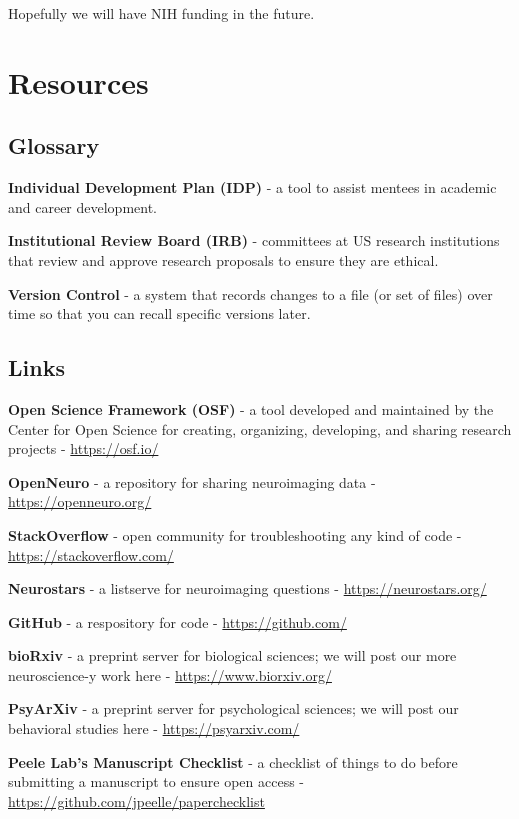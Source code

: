 \documentclass[
]{book}
\begin{document}
Hopefully we will have NIH funding in the future.

\hypertarget{resources}{%
\chapter{Resources}\label{resources}}

\hypertarget{glossary}{%
\section{Glossary}\label{glossary}}

\textbf{Individual Development Plan (IDP)} - a tool to assist mentees in academic and career development.

\textbf{Institutional Review Board (IRB)} - committees at US research institutions that review and approve research proposals to ensure they are ethical.

\textbf{Version Control} - a system that records changes to a file (or set of files) over time so that you can recall specific versions later.

\hypertarget{links}{%
\section{Links}\label{links}}

\textbf{Open Science Framework (OSF)} - a tool developed and maintained by the Center for Open Science for creating, organizing, developing, and sharing research projects - \url{https://osf.io/}

\textbf{OpenNeuro} - a repository for sharing neuroimaging data - \url{https://openneuro.org/}

\textbf{StackOverflow} - open community for troubleshooting any kind of code - \url{https://stackoverflow.com/}

\textbf{Neurostars} - a listserve for neuroimaging questions - \url{https://neurostars.org/}

\textbf{GitHub} - a respository for code - \url{https://github.com/}

\textbf{bioRxiv} - a preprint server for biological sciences; we will post our more neuroscience-y work here - \url{https://www.biorxiv.org/}

\textbf{PsyArXiv} - a preprint server for psychological sciences; we will post our behavioral studies here - \url{https://psyarxiv.com/}

\textbf{Peele Lab's Manuscript Checklist} - a checklist of things to do before submitting a manuscript to ensure open access - \url{https://github.com/jpeelle/paperchecklist}

  
\end{document}
